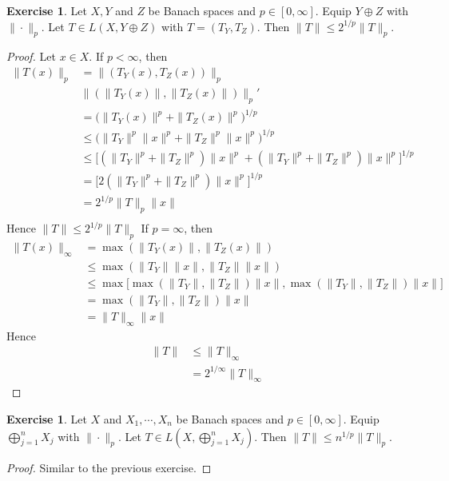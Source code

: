 \documentclass[12pt]{amsart}
\theoremstyle{definition}
\newtheorem{ex}[definition]{Exercise}
\DeclareMathOperator*{\0}{\mbf{0}}
\DeclareMathOperator*{\1}{\mbf{1}}
\begin{document}
	
	\begin{ex}
	Let $X, Y$ and $Z$ be Banach spaces and $p \in [0, \infty]$. Equip $Y \oplus Z$ with $\|\cdot\|_p$. Let $T \in L(X, Y \oplus Z)$ with $T = (T_Y, T_Z)$. Then $\|T\|\leq 2^{1/p}\|T\|_p$.
	\end{ex}
	
	\begin{proof}
	Let $x \in X$. If $p < \infty$, then
	\begin{align*}
	\|T(x)\|_p
	&= \|(T_Y(x), T_Z(x))\|_p \\
	& \|( \|T_Y(x)\|, \|T_Z(x)\|)\|_p' \\
	&=  \bigg(\|T_Y(x) \|^p +  \|T_Z(x) \|^p \bigg)^{1/p} \\
	& \leq \bigg(\|T_Y\|^p\|x\|^p +  \|T_Z\|^p\|x\|^p \bigg)^{1/p} \\
	& \leq \bigg[ (\|T_Y\|^p+ \|T_Z\|^p)\|x\|^p +  (\|T_Y\|^p + \|T_Z\|^p)\|x\|^p \bigg ]^{1/p} \\
	&= \bigg[ 2(\|T_Y\|^p + \|T_Z\|^p)\|x\|^p \bigg ]^{1/p} \\
	&= 2^{1/p}\|T\|_p\|x\| \\
	\end{align*}
	Hence $\|T\| \leq 2^{1/p}\|T\|_p$
	If $p = \infty$, then 
	\begin{align*}
	\|T(x)\|_{\infty} 
	&= \max(\|T_Y(x) \|, \|T_Z(x)\|) \\
	& \leq \max(\|T_Y\|\|x \|, \|T_Z\|\|x\|) \\
	& \leq \max \bigg[ \max (\|T_Y\|, \|T_Z\|)\|x \|, \max(\|T_Y\| ,\|T_Z\|)\|x\| \bigg] \\
	&= \max(\|T_Y\| ,\|T_Z\|) \|x\|\\
	&= \|T\|_{\infty} \|x\|
	\end{align*}
	Hence 
	\begin{align*}
	\|T\| 
	& \leq \|T\|_{\infty} \\
	&= 2^{1/\infty}\|T\|_{\infty}
	\end{align*}
	\end{proof}
	
	\begin{ex}
	Let $X$ and $X_1, \cdots, X_n$ be Banach spaces and $p \in [0, \infty]$. Equip $\bigoplus\limits_{j=1}^n X_j$ with $\|\cdot\|_p$. Let $T \in L(X, \bigoplus\limits_{j=1}^n X_j)$. Then $\|T\|\leq n^{1/p}\|T\|_p$.
	\end{ex}
	
	\begin{proof}
	Similar to the previous exercise.
	\end{proof}
	
\end{document}

